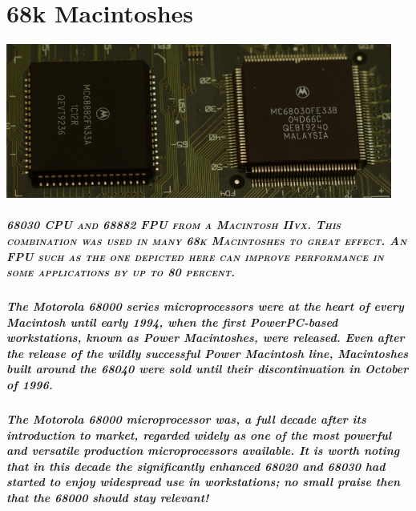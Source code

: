 
\chapter{68k Macintoshes}

\begin{center}
\includegraphics[height=2in]{68k/68030-68882-33.pdf} \\
\end{center}

\paragraph{\scriptsize{\textsc{%
68030 CPU and 68882 FPU from a Macintosh IIvx. This combination %
was used in many 68k Macintoshes to great effect. An FPU such as %
the one depicted here can improve performance in some applications %
by up to 80 percent.}}}

\paragraph{%
The Motorola 68000 series microprocessors were at the heart of every Macintosh %
until early 1994, when the first PowerPC-based workstations, known as Power %
Macintoshes, were released. Even after the release of the wildly successful %
Power Macintosh line, Macintoshes built around the 68040 were sold until %
their discontinuation in October of 1996. %
}

\paragraph{%
The Motorola 68000 microprocessor was, a full decade after its introduction to %
market, regarded widely as one of the most powerful and versatile production %
microprocessors available. It is worth noting that in this decade the %
significantly enhanced 68020 and 68030 had started to enjoy widespread use %
in workstations; no small praise then that the 68000 should stay relevant! %
}

